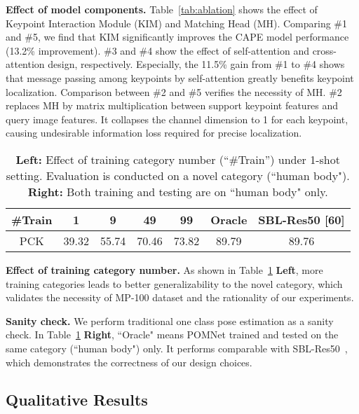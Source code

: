 \documentclass[runningheads]{llncs}
\begin{document}
\textbf{Effect of model components.} Table~\ref{tab:ablation} shows the effect of Keypoint Interaction Module (KIM) and Matching Head (MH). Comparing \#1 and \#5, we find that KIM significantly improves the CAPE model performance (13.2\% improvement). \#3 and \#4 show the effect of self-attention and cross-attention design, respectively. Especially, the 11.5\% gain from \#1 to \#4 shows that message passing among keypoints by self-attention greatly benefits keypoint localization. Comparison between \#2 and \#5 verifies the necessity of MH. \#2 replaces MH by matrix multiplication between support keypoint features and query image features. It collapses the channel dimension to 1 for each keypoint, causing undesirable information loss required for precise localization. 


\begin{table}[htb]
    \setlength\tabcolsep{6pt}
	\begin{center}
	\caption{\textbf{Left:} Effect of training category number (``\#Train'') under 1-shot setting. Evaluation is conducted on a novel category (``human body").
	\textbf{Right:} Both training and testing are on ``human body" only.}
		\begin{tabular}{ccccc||cc}
			\hline
			\#Train & 1 & 9 & 49 & 99 & Oracle & SBL-Res50 [60] \\\hline
			PCK & 39.32 & 55.74 & 70.46 & 73.82 & 89.79 & 89.76 \\ \hline
		\end{tabular}
	\label{tab:num_class}
	\end{center}
\end{table}

\textbf{Effect of training category number.} As shown in Table~\ref{tab:num_class} \textbf{Left}, more training categories leads to better generalizability to the novel category, which validates the necessity of MP-100 dataset and the rationality of our experiments.

\textbf{Sanity check.} We perform traditional one class pose estimation as a sanity check. In Table~\ref{tab:num_class} \textbf{Right}, ``Oracle" means POMNet trained and tested on the same category (``human body") only. It performs comparable with SBL-Res50~\cite{he2016deep}, which demonstrates the correctness of our design choices.


\subsection{Qualitative Results}
\end{document}
